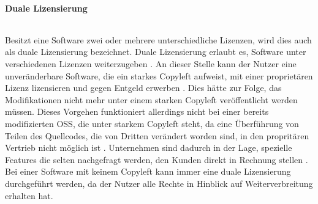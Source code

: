 \paragraph{Duale Lizensierung} $~$

Besitzt eine Software zwei oder mehrere unterschiedliche Lizenzen, wird dies auch als duale Lizensierung bezeichnet. Duale Lizensierung erlaubt es, Software unter verschiedenen Lizenzen weiterzugeben \cite{gerlach_praxisprobleme_2006}. An dieser Stelle kann der Nutzer eine unveränderbare Software, die ein starkes Copyleft aufweist, mit einer proprietären Lizenz lizensieren und gegen Entgeld erwerben \cite[S. 29]{bitkom_open_2016}. Dies hätte zur Folge, das Modifikationen nicht mehr unter einem starken Copyleft veröffentlicht werden müssen. Dieses Vorgehen funktioniert allerdings nicht bei einer bereits modifizierten OSS, die unter starkem Copyleft steht, da eine Überführung von Teilen des Quellcodes, die von Dritten verändert worden sind, in den propritären Vertrieb nicht möglich ist \cite[S. 31]{schaaf_open-source-lizenzen_2013}. Unternehmen sind dadurch in der Lage, spezielle Features die selten nachgefragt werden, den Kunden direkt in Rechnung stellen \cite[S. 29]{bitkom_open_2016}. Bei einer Software mit keinem Copyleft kann immer eine duale Lizensierung durchgeführt werden, da der Nutzer alle Rechte in Hinblick auf Weiterverbreitung erhalten hat. 






